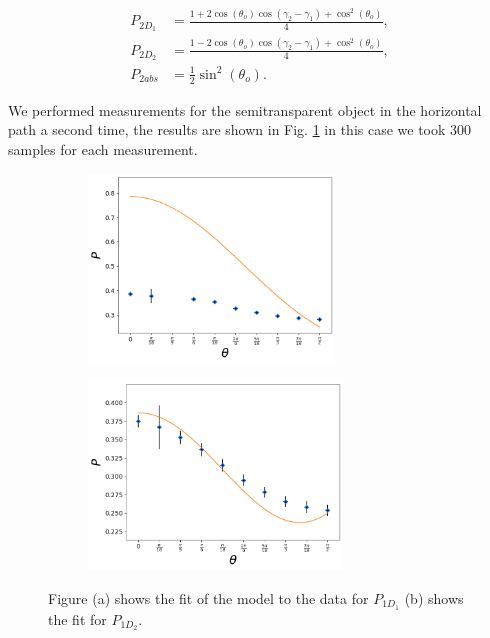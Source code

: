 \documentclass[12pt]{book}
\begin{document}

\begin{align*}
 P_{2D_{1}}&=\frac{1+2\cos(\theta_{o})\cos(\gamma_{2}-\gamma_{1})+\cos^{2}(\theta_{o})}{4},\\
 P_{2D_{2}}&=\frac{1-2\cos(\theta_{o})\cos(\gamma_{2}-\gamma_{1})+\cos^{2}(\theta_{o})}{4},\\
 P_{2abs}&=\frac{1}{2}\sin^{2}(\theta_{o}).
\end{align*}

We performed measurements for the semitransparent object in the horizontal path a second time, the results are shown in Fig. \ref{segundass} in this case we took 300 samples for each measurement.

\begin{figure}[t!]
\centering
\begin{subfigure}[b]{0.45\linewidth}
\includegraphics[width=\linewidth,height=5cm]{images/ajuste_jueves_11_50:50.png}
\caption{}
\end{subfigure}
\begin{subfigure}[b]{0.45\linewidth}
\includegraphics[width=\linewidth,height=5cm]{images/ajuste_jueves_21_50:50.png}
\caption{}
\end{subfigure}
\caption{Figure (a) shows the fit of the model to the data for $P_{1D_{1}}$ (b) shows the fit for $P_{1D_{2}}$.}
\label{segundass}
\end{figure}
\end{document}
